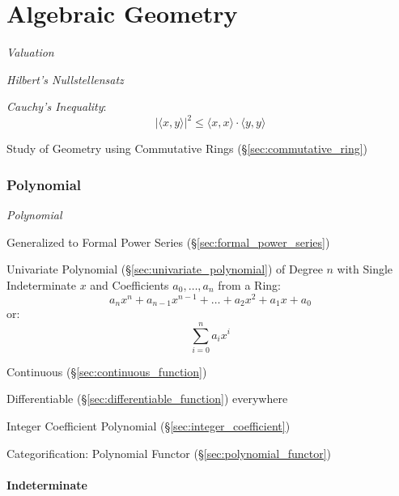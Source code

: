 \part{Algebraic Geometry}\label{part:algebraic_geometry}

\emph{Valuation}

\emph{Hilbert's Nullstellensatz}

\emph{Cauchy's Inequality}:
\[
    |\langle x,y \rangle|^2 \leq \langle x,x \rangle \cdot \langle
    y,y \rangle
\]

Study of Geometry using Commutative Rings
(\S\ref{sec:commutative_ring})



\section{Polynomial}\label{sec:polynomial}

\emph{Polynomial}

Generalized to Formal Power Series (\S\ref{sec:formal_power_series})

Univariate Polynomial (\S\ref{sec:univariate_polynomial}) of Degree
$n$ with Single Indeterminate $x$ and Coefficients $a_0, \ldots, a_n$
from a Ring:
\[
  a_n x^n + a_{n-1} x^{n-1} + \ldots + a_2 x^2 + a_1 x + a_0
\]
or:
\[
  \sum_{i=0}^n a_i x^i
\]

Continuous (\S\ref{sec:continuous_function})

Differentiable (\S\ref{sec:differentiable_function}) everywhere

Integer Coefficient Polynomial (\S\ref{sec:integer_coefficient})

Categorification: Polynomial Functor (\S\ref{sec:polynomial_functor})



\subsection{Indeterminate}\label{sec:indeterminate}

